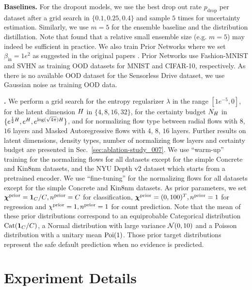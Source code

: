 \textbf{Baselines.} For the dropout models, we use the best drop out rate $p_{\text{drop}}$ per dataset after a grid search in $\{0.1, 0.25, 0.4\}$ and sample $5$ times for uncertainty estimation. Similarly, we use $m=5$ for the ensemble baseline and the distribution distillation. Note that \citet{dataset-shift} found that a relative small ensemble size (e.g. $m=5$) may indeed be sufficient in practice. We also train Prior Networks where we set $\beta_\text{in}=1e^2$ as suggested in the original papers \citep{priornet, reverse-kl}. Prior Networks use Fashion-MNIST and SVHN as training OOD datasets for MNIST and CIFAR-10, respectively. As there is no available OOD dataset for the Sensorless Drive dataset, we use Gaussian noise as training OOD data. 

\textbf{\NatPN{}.} We perform a grid search for the entropy regularizer $\lambda$ in the range $[1e^{-5}, 0]$, for the latent dimension $H$ in $\{4, 8, 16, 32\}$, for the certainty budget $N_H$ in $\{e^{\frac{1}{2}H}, e^{H}, e^{\log(\sqrt{4\pi})H}\}$, and for normalizing flow type between radial flows \citep{radialflow} with $8$, $16$ layers and Masked Autoregressive flows \citep{maf, made} with $4$, $8$, $16$ layers. Further results on latent dimensions, density types, number of normalizing flow layers and certainty budget are presented in Sec.~\ref{sec:ablation-study_007}. We use ``warm-up'' training for the normalizing flows for all datasets except for the simple Concrete and Kin8nm datasets, and the NYU Depth v2 dataset which starts from a pretrained encoder. We use ``fine-tuning'' for the normalizing flows for all datasets except for the simple Concrete and Kin8nm datasets. As prior parameters, we set ${\bm{\chi}^\text{prior}=\bm{1}_{C}/C}, {n^\text{prior}=C}$ for classification, ${\bm{\chi}^\text{prior}=(0, 100)^T}, n^\text{prior}=1$ for regression and $\chi^\text{prior}=1, n^\text{prior}=1$ for count prediction. Note that the mean of these prior distributions correspond to an equiprobable Categorical distribution $\operatorname{Cat}(\bm{1}_{C}/C)$, a Normal distribution with large variance $\operatorname{\mathcal{N}}(0, 10)$ and a Poisson distribution with a unitary mean $\operatorname{Poi}(1)$. Those prior target distributions represent the safe default prediction when no evidence is predicted.

\section{Experiment Details}
\label{sec:experiment}

